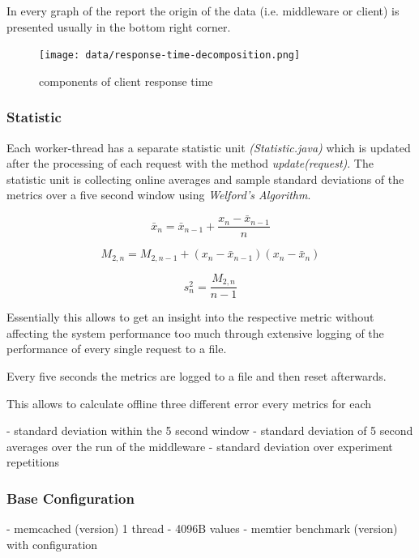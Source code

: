 \documentclass[11pt,a4paper]{article}
\begin{document}
In every graph of the report the origin of the data (i.e. middleware or client) is presented usually in the bottom right corner.


\begin{figure}
	\centering
	\texttt{[image: data/response-time-decomposition.png]}
	\caption{components of client response time}
\end{figure}

\subsubsection{Statistic}

Each worker-thread has a separate statistic unit \emph{(Statistic.java)} which is updated after the processing of each request with the method \emph{update(request)}.  
The statistic unit is collecting online averages and sample standard deviations of the metrics over a five second window using \emph{Welford's Algorithm}.\cite{Knuth:1997:ACP:270146}


\begin{equation}
	\bar{x}_n = \bar{x}_{n-1} + \frac{x_n -\bar{x}_{n-1}}{n}
\end{equation}

\begin{equation}
	M_{2,n} = M_{2,n-1} + (x_n - \bar{x}_{n-1})(x_n - \bar{x}_n)
\end{equation}

\begin{equation}
	s^2_n = \frac{M_{2,n}}{n-1}
\end{equation}

Essentially this allows to get an insight into the respective metric without affecting the system performance too much through extensive logging of the performance of every single request to a file. 

Every five seconds the metrics are logged to a file and then reset afterwards.

This allows to calculate offline three different error every metrics for each 

- standard deviation within the 5 second window
- standard deviation of 5 second averages over the run of the middleware
- standard deviation over experiment repetitions 



\subsubsection{Base Configuration}
- memcached (version) 1 thread
- 4096B values
- memtier benchmark (version) with configuration
\end{document}
